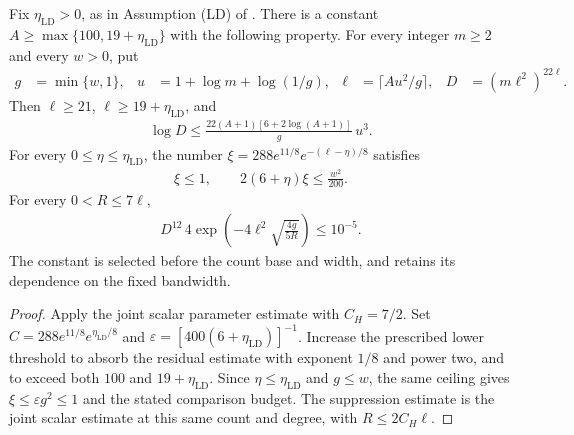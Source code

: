 \begin{lemma}
    \label{lem:fixed_bandwidth_low_density_filter_parameters}
    \leanok
    Fix $\eta_{\mathrm{LD}}>0$, as in Assumption (LD) of
    \cite[lines 281--284]{Arad2016RigorousRG}. There is a constant
    $A\ge\max\{100,19+\eta_{\mathrm{LD}}\}$ with the following property.
    For every integer $m\ge2$ and every $w>0$, put
    \begin{align*}
        g    & =\min\{w,1\},         &
        u    & =1+\log m+\log(1/g),  &
        \ell & =\lceil Au^2/g\rceil, &
        D    & =(m\ell^2)^{22\ell}.
    \end{align*}
    Then $\ell\ge21$, $\ell\ge19+\eta_{\mathrm{LD}}$, and
    \begin{align*}
        \log D\le
        \frac{22(A+1)[6+2\log(A+1)]}{g}\,u^3.
    \end{align*}
    For every $0\le\eta\le\eta_{\mathrm{LD}}$, the number
    $\xi=288e^{11/8}e^{-(\ell-\eta)/8}$ satisfies
    \begin{align*}
        \xi\le1,\qquad 2(6+\eta)\xi\le\frac{w^2}{200}.
    \end{align*}
    For every $0<R\le7\ell$,
    \begin{align*}
        D^{12}\,4\exp\left(-4\ell^2
        \sqrt{\frac{4g}{5R}}\right)\le10^{-5}.
    \end{align*}
    The constant is selected before the count base and width, and retains
    its dependence on the fixed bandwidth.
\end{lemma}
\begin{proof}
    \leanok
    Apply the joint scalar parameter estimate with $C_H=7/2$.
    Set $C=288e^{11/8}e^{\eta_{\mathrm{LD}}/8}$ and
    $\varepsilon=[400(6+\eta_{\mathrm{LD}})]^{-1}$.
    Increase the prescribed lower threshold to absorb the residual estimate
    with exponent $1/8$ and power two, and to exceed both $100$ and
    $19+\eta_{\mathrm{LD}}$.
    Since $\eta\le\eta_{\mathrm{LD}}$ and $g\le w$, the same ceiling
    gives $\xi\le\varepsilon g^2\le1$ and the stated comparison budget.
    The suppression estimate is the joint scalar estimate at this same
    count and degree, with $R\le2C_H\ell$.
\end{proof}
